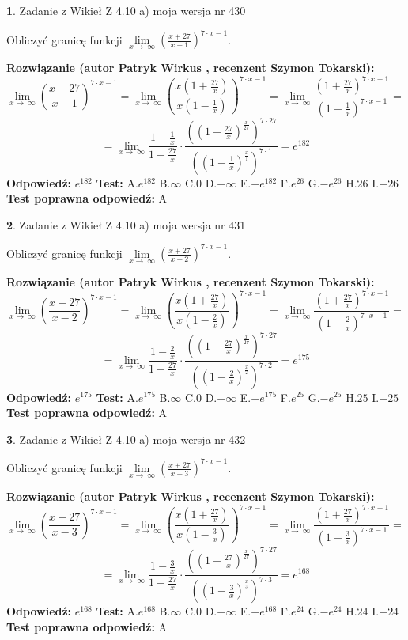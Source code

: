 \documentclass[12pt, a4paper]{article}
\theoremstyle{definition} %
\newtheorem{zad}{}
\newcommand{\zadStart}[1]{\begin{zad}#1\newline}
\newcommand{\zadStop}{\end{zad}}
\newcommand{\rozwStart}[2]{\noindent \textbf{Rozwiązanie (autor #1 , recenzent #2): }\newline}
\newcommand{\rozwStop}{\newline}
\newcommand{\odpStart}{\noindent \textbf{Odpowiedź:}\newline}
\newcommand{\odpStop}{\newline}
\newcommand{\testStart}{\noindent \textbf{Test:}\newline}
\newcommand{\testStop}{\newline}
\newcommand{\kluczStart}{\noindent \textbf{Test poprawna odpowiedź:}\newline}
\newcommand{\kluczStop}{\newline}
\begin{document}
\zadStart{Zadanie z Wikieł Z 4.10 a) moja wersja nr 430}

Obliczyć granicę funkcji  $\lim\limits_{x\to\ \infty}(\frac{x+27}{x-1})^{7\cdot x-1}$.
\zadStop
\rozwStart{Patryk Wirkus}{Szymon Tokarski}
$$\lim\limits_{x\to\ \infty}(\frac{x+27}{x-1})^{7\cdot x-1} = \lim\limits_{x\to\ \infty}(\frac{x(1+\frac{27}{x})}{x(1-\frac{1}{x})})^{7\cdot x-1}=\lim\limits_{x\to\ \infty}\frac{(1+\frac{27}{x})^{7\cdot x-1}}{(1-\frac{1}{x})^{7\cdot x-1}}=$$
$$=\lim\limits_{x\to\ \infty}\frac{1-\frac{1}{x}}{1+\frac{27}{x}}\cdot\frac{((1+\frac{27}{x})^{\frac{x}{27}})^{7\cdot27}}{((1-\frac{1}{x})^{\frac{x}{1}})^{7\cdot1}}=e^{182}$$
\rozwStop
\odpStart
$e^{182}$
\odpStop
\testStart
A.$e^{182}$ B.$\infty$ C.$0$ D.$-\infty$ E.$-e^{182}$
F.$e^{26}$ G.$-e^{26}$
H.$26$
I.$-26$
\testStop
\kluczStart
A
\kluczStop



\zadStart{Zadanie z Wikieł Z 4.10 a) moja wersja nr 431}

Obliczyć granicę funkcji  $\lim\limits_{x\to\ \infty}(\frac{x+27}{x-2})^{7\cdot x-1}$.
\zadStop
\rozwStart{Patryk Wirkus}{Szymon Tokarski}
$$\lim\limits_{x\to\ \infty}(\frac{x+27}{x-2})^{7\cdot x-1} = \lim\limits_{x\to\ \infty}(\frac{x(1+\frac{27}{x})}{x(1-\frac{2}{x})})^{7\cdot x-1}=\lim\limits_{x\to\ \infty}\frac{(1+\frac{27}{x})^{7\cdot x-1}}{(1-\frac{2}{x})^{7\cdot x-1}}=$$
$$=\lim\limits_{x\to\ \infty}\frac{1-\frac{2}{x}}{1+\frac{27}{x}}\cdot\frac{((1+\frac{27}{x})^{\frac{x}{27}})^{7\cdot27}}{((1-\frac{2}{x})^{\frac{x}{2}})^{7\cdot2}}=e^{175}$$
\rozwStop
\odpStart
$e^{175}$
\odpStop
\testStart
A.$e^{175}$ B.$\infty$ C.$0$ D.$-\infty$ E.$-e^{175}$
F.$e^{25}$ G.$-e^{25}$
H.$25$
I.$-25$
\testStop
\kluczStart
A
\kluczStop



\zadStart{Zadanie z Wikieł Z 4.10 a) moja wersja nr 432}

Obliczyć granicę funkcji  $\lim\limits_{x\to\ \infty}(\frac{x+27}{x-3})^{7\cdot x-1}$.
\zadStop
\rozwStart{Patryk Wirkus}{Szymon Tokarski}
$$\lim\limits_{x\to\ \infty}(\frac{x+27}{x-3})^{7\cdot x-1} = \lim\limits_{x\to\ \infty}(\frac{x(1+\frac{27}{x})}{x(1-\frac{3}{x})})^{7\cdot x-1}=\lim\limits_{x\to\ \infty}\frac{(1+\frac{27}{x})^{7\cdot x-1}}{(1-\frac{3}{x})^{7\cdot x-1}}=$$
$$=\lim\limits_{x\to\ \infty}\frac{1-\frac{3}{x}}{1+\frac{27}{x}}\cdot\frac{((1+\frac{27}{x})^{\frac{x}{27}})^{7\cdot27}}{((1-\frac{3}{x})^{\frac{x}{3}})^{7\cdot3}}=e^{168}$$
\rozwStop
\odpStart
$e^{168}$
\odpStop
\testStart
A.$e^{168}$ B.$\infty$ C.$0$ D.$-\infty$ E.$-e^{168}$
F.$e^{24}$ G.$-e^{24}$
H.$24$
I.$-24$
\testStop
\kluczStart
A
\kluczStop
\end{document}
